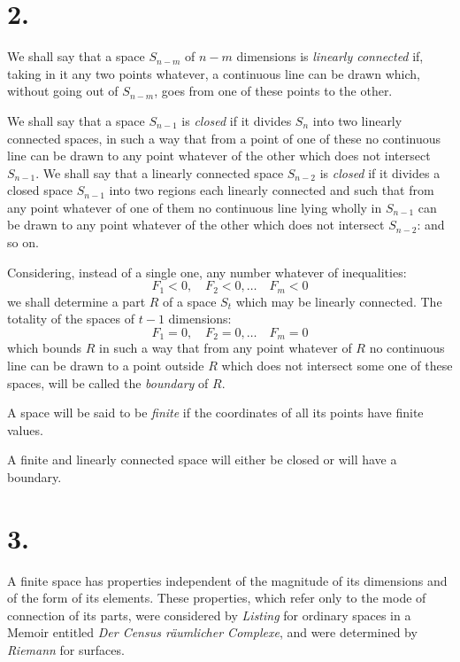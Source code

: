 \documentclass{article}
\begin{document}
\section*{2.}

We shall say that a space $S_{n-m}$ of $n-m$ dimensions is \emph{linearly connected} if, taking in it any two points whatever, a continuous line can be drawn which, without going out of $S_{n-m}$, goes from one of these points to the other.


We shall say that a space $S_{n-1}$ is \emph{closed} if it divides $S_{n}$ into two linearly connected spaces, in such a way that from a point of one of these no continuous line can be drawn to any point whatever of the other which does not intersect $S_{n-1}$. We shall say that a linearly connected space $S_{n-2}$ is \emph{closed} if it divides a closed space $S_{n-1}$ into two regions each linearly connected and such that from any point whatever of one of them no continuous line lying wholly in $S_{n-1}$ can be drawn to any point whatever of the other which does not intersect $S_{n-2}$: and so on.

Considering, instead of a single one, any number whatever of inequalities:
\[ F_{1} < 0, \quad F_{2} < 0,\ldots \quad F_{m} < 0 \]
we shall determine a part $R$ of a space $S_{t}$ which may be linearly connected. The totality of the spaces of $t-1$ dimensions:
\[ F_{1} = 0, \quad F_{2} = 0,\ldots \quad F_{m} = 0 \]
which bounds $R$ in such a way that from any point whatever of $R$ no continuous line can be drawn to a point outside $R$ which does not intersect some one of these spaces, will be called the \emph{boundary} of $R$.

A space will be said to be \emph{finite} if the coordinates of all its points have finite values.

A finite and linearly connected space will either be closed or will have a boundary.

\section*{3.}

A finite space has properties independent of the magnitude of its dimensions and of the form of its elements. These properties, which refer only to the mode of connection of its parts, were considered by \emph{Listing} for ordinary spaces in a Memoir entitled \emph{Der Census räumlicher Complexe}, and were determined by \emph{Riemann} for surfaces.
\end{document}
